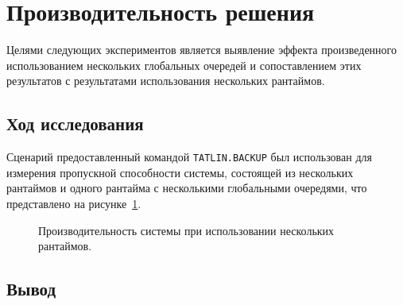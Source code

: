 \section{Производительность решения}

Целями следующих экспериментов является выявление эффекта произведенного использованием нескольких глобальных очередей и сопоставлением этих результатов с результатами использования нескольких рантаймов.

\subsection{Ход исследования}

Сценарий предоставленный командой \verb|TATLIN.BACKUP| был использован для измерения пропускной способности системы, состоящей из нескольких рантаймов и одного рантайма с несколькими глобальными очередями, что представлено на рисунке~\ref{fig:tatlin:multi_rt_gp:eval}.

\begin{figure}[H]
    \begin{center}
    \end{center}

    \caption{Производительность системы при использовании нескольких рантаймов.}
    \label{fig:tatlin:multi_rt_gp:eval}
\end{figure}

\subsection{Вывод}

